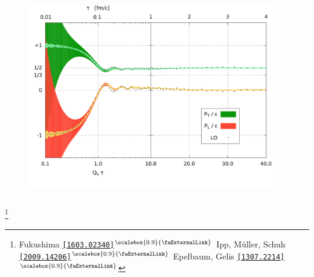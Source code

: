 \documentclass[aspectratio=169,11pt,usenames,dvipsnames]{beamer}
\renewcommand{\thefootnote}{\color{customblue}\faPaperPlaneO}
\newcommand\blfootnote[1]{%
  \begingroup
  \renewcommand\thefootnote{}\footnote{#1}%
  \addtocounter{footnote}{-1}%
  \endgroup
}
\begin{document}
\begin{frame}
\begin{columns}[onlytextwidth,t]
        \begin{center}
            \begin{figure}
                \centering
                \hspace{-5pt}\includegraphics[width=0.95\textwidth]{images/ratio-0_1-1.pdf}
            \end{figure}
        \end{center}

    \end{columns}
    \blfootnote{\scriptsize Fukushima \href{https://arxiv.org/abs/1603.02340}{{\color{palteal}\texttt{[1603.02340]}$^\text{\scalebox{0.9}{\faExternalLink}}$}} Ipp, Müller, Schuh \href{https://arxiv.org/abs/2009.14206}{{\color{palgold}\texttt{[2009.14206]}$^\text{\scalebox{0.9}{\faExternalLink}}$}} Epelbaum, Gelis \href{https://arxiv.org/abs/1307.2214}{{\color{palviolet}\texttt{[1307.2214]}$^\text{\scalebox{0.9}{\faExternalLink}}$}} 
    }
\end{frame}

\end{document}
